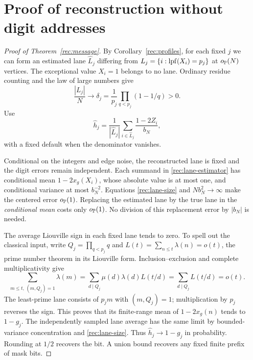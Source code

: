 \section{Proof of reconstruction without digit addresses}\label{rec:message-proof}

\begin{proof}[Proof of Theorem~\ref{rec:message}]
By Corollary~\ref{rec:profiles}, for each fixed $j$ we can form an
estimated lane $\widehat L_j$ differing from
$L_j=\{i:\operatorname{lpf}(X_i)=p_j\}$ at $o_{\mathbb P}(N)$ vertices. The exceptional
value $X_i=1$ belongs to no lane. Ordinary residue counting and the
law of large numbers give
\begin{equation}\label{rec:lane-size}
 \frac{|L_j|}{N}\longrightarrow
 \delta_j=\frac1{p_j}\prod_{q<p_j}(1-1/q)>0.
\end{equation}
Use
\begin{equation}\label{rec:lane-estimator}
 \widehat h_j=\frac1{|\widehat L_j|}
              \sum_{i\in\widehat L_j}\frac{1-2Z_i}{b_N},
\end{equation}
with a fixed default when the denominator vanishes.

Conditional on the integers and edge noise, the reconstructed lane
is fixed and the digit errors remain independent. Each summand in
\eqref{rec:lane-estimator} has conditional mean $1-2x_g(X_i)$,
whose absolute value is at most one, and conditional variance at
most $b_N^{-2}$. Equations \eqref{rec:lane-size} and $Nb_N^2\to\infty$
make the centered error $o_{\mathbb P}(1)$. Replacing the estimated lane
by the true lane in the \emph{conditional mean} costs only
$o_{\mathbb P}(1)$. No division of this replacement error by $|b_N|$
is needed.

The average Liouville sign in each fixed lane tends to zero. To spell
out the classical input, write $Q_j=\prod_{q<p_j}q$ and
$L(t)=\sum_{n\le t}\lambda(n)=o(t)$, the prime number theorem in
its Liouville form. Inclusion--exclusion and complete multiplicativity
give
\[
 \sum_{m\le t,\ (m,Q_j)=1}\lambda(m)
 =\sum_{d\mid Q_j}\mu(d)\lambda(d)L(t/d)
 =\sum_{d\mid Q_j}L(t/d)=o(t).
\]
The least-prime lane consists of $p_jm$ with $(m,Q_j)=1$; multiplication
by $p_j$ reverses the sign. This proves that its finite-range mean
of $1-2x_g(n)$ tends to $1-g_j$. The independently sampled lane
average has the same limit by bounded-variance concentration and
\eqref{rec:lane-size}. Thus $\widehat h_j\to1-g_j$ in probability.
Rounding at $1/2$ recovers the bit. A union bound recovers any fixed
finite prefix of mask bits.


\end{proof}
